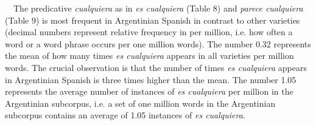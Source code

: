 \documentclass[10pt]{article}
\newenvironment{styleStandard}{\renewcommand\baselinestretch{1.25}\setlength\leftskip{0cm}\setlength\rightskip{0cm}\setlength\parindent{0cm}\setlength\parfillskip{0pt plus 1fil}\setlength\parskip{0in plus 1pt}\writerlistparindent\writerlistleftskip\leavevmode\normalfont\normalsize\fontsize{12pt}{14.4pt}\selectfont\writerlistlabel\ignorespaces}{\unskip\vspace{0in plus 1pt}\par}
\newcommand\writerlistleftskip{}
\newcommand\writerlistparindent{}
\newcommand\writerlistlabel{}
\newcounter{Table}
\begin{document}
\begin{styleStandard}
\ \ The predicative \textit{cualquiera} as in \textit{es cualquiera }(Table 8) and\textit{ parece cualquiera} (Table 9) is most frequent in Argentinian Spanish in contrast to other varieties (decimal numbers represent relative frequency in per million, i.e. how often a word or a word phrase occurs per one million words). The number 0.32 represents the mean of how many times \textit{es cualquiera} appears in all varieties per million words. The crucial observation is that the number of times \textit{es cualquiera} appears in Argentinian Spanish is three times higher than the mean. The number 1.05 represents the average number of instances of \textit{es cualquiera} per million in the Argentinian subcorpus, i.e. a set of one million words in the Argentinian subcorpus contains an average of 1.05 instances of \textit{es cualquiera}. 
\end{styleStandard}
\end{document}
